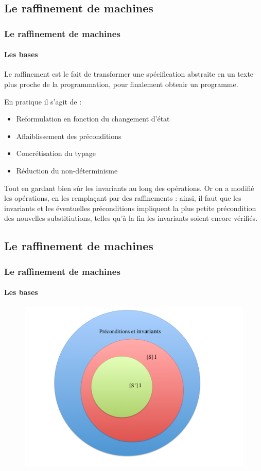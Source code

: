 \documentclass[11pt,a4paper,xcolor=table]{beamer} %
\begin{document}
\subsection{Le raffinement de machines}
\begin{frame}
\frametitle{Le raffinement de machines}
\framesubtitle{Les bases}
Le raffinement est le fait de transformer une spécification abstraite en un texte plus proche de la programmation, pour finalement obtenir un programme.

En pratique il s'agit de :
\begin{itemize}
\pause
\item Reformulation en fonction du changement d’état
\pause
\item Affaiblissement des préconditions
\pause
\item Concrétisation du typage
\pause
\item Réduction du non-déterminisme
\end{itemize}
\pause
Tout en gardant bien sûr les invariants au long des opérations. Or on a modifié les opérations, en les remplaçant par des raffinements : ainsi, il faut que les invariants et les éventuelles préconditions impliquent la plus petite précondition des nouvelles substitiutions, telles qu'à la fin les invariants soient encore vérifiés.
\end{frame}

\subsection{Le raffinement de machines}
\begin{frame}
\frametitle{Le raffinement de machines}
\framesubtitle{Les bases}
\begin{figure}[h]
\centering
\includegraphics[scale=0.25]{ressources/cond.png}
\end{figure}
\end{frame}
\end{document}
